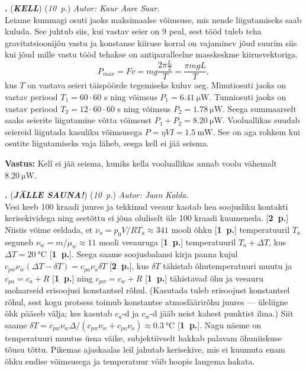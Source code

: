 \documentclass[12pt,a5paper]{article}
\newcommand{\numb}[1]{\vspace{5pt}\textbf{\large #1}}
\newcommand{\nimi}[1]{(\textsl{\small #1})}
\newcommand{\punktid}[1]{(\emph{#1~p.})}
\newcounter{ylesanne}
\newcommand{\yl}[1]{\addtocounter{ylesanne}{1}\numb{\theylesanne.} \nimi{\bf{#1}} \newblock{}}
\newcommand{\pp}[1]{[\textbf{#1~p.}]}
\newcommand{\autor}[1]{\emph{ Autor: #1.\\}}
\begin{document}
\yl{KELL} \punktid{10} \autor{Kaur Aare Saar}
Leiame kummagi osuti jaoks maksimaalse võimsuse, mis nende liigutamiseks saab
kuluda. See juhtub siis, kui vastav seier on $9$ peal, sest tööd tuleb teha
gravitatsioonijõu vastu ja konstanse kiiruse korral on vajaminev jõud suurim
siis kui jõud mille vastu tööd tehakse on antiparalleelne masskeskme
kiirusvektoriga.
$$P_{max} = F v = mg \frac{2 \pi \frac{L}{2}}{T} = \frac{\pi mgL}{T},$$
kus $T$ on vastava seieri täispöörde tegemiseks kuluv aeg.
Minutiosuti jaoks on vastav periood $T_1={60\cdot60}$ s ning võimsus $P_1 =\SI{6.41}{\micro\watt}$.
Tunniosuti jaoks on vastav periood $T_2={12\cdot 60\cdot60}$ s ning võimsus $P_2=\SI{1.78}{\micro\watt}$. Seega summaarselt saaks
seierite liigutamine võtta võimsust $P_1+P_2 = \SI {8.20}{\micro\watt}$.
Vooluallikas suudab seiereid liigutada kasuliku võimsusega
$P=\eta VI=\SI{1.5}{\milli\watt}$. See on aga rohkem kui osutite liigutamiseks
vaja läheb, seega kell ei jää seisma.

\textbf{Vastus:}
Kell ei jää seisma, kuniks kella vooluallikas annab voolu vähemalt
$\SI {8.20}{\micro\watt}$.


\yl{JÄLLE SAUNA!} \punktid{10} \autor{Jaan Kalda}
Vesi keeb 100 kraadi juures ja tekkinud veeaur kaotab hea soojusliku kontakti kerisekividega ning seetõttu ei jõua oluliselt üle 100 kraadi kuumeneda. \pp{2} Niisiis võime eeldada, et $\nu_a=p_0V/RT_a\approx 341$ mooli õhku \pp{1} temperatuuril $T_a$ seguneb $\nu_w=m/\mu_w\approx 11$ mooli veeauruga \pp{1} temperatuuril $T_a+\Delta T$, kus $\Delta T=\SI {20}\celsius$ \pp{1}. Seega saame soojusbalansi kirja panna kujul $c_{pw}\nu_w(\Delta T-\delta T)=c_{pa}\nu_a\delta T$ \pp{2}, kus $\delta T$ tähistab õhutemperatuuri muutu ja $c_{pa}=c_a+R$ \pp{1} ning $c_{pw}=c_w+R$ \pp{1} tähistavad õhu ja veeauru molaarseid erisoojusi konstantsel rõhul. (Kasutada tuleb erisoojust konstantsel rõhul, sest kogu protsess toimub konstantse atmosfäärirõhu juures --- üleliigne õhk pääseb välja; kes kasutab $c_a$-d ja $c_w$-d jääb neist kahest punktist ilma.) Siit saame $\delta T=c_{pw}\nu_w\Delta/(c_{pw}\nu_w+c_{pa}\nu_a)\approx\SI{0.3}\celsius$ \pp{1}. Nagu näeme on temperatuuri muutus üsna väike, subjektiivselt hakkab palavam õhuniiskuse tõusu tõttu. Pikemas ajaskaalas leil jahutab kerisekive, mis ei kuumuta enam õhku endise võimsusega ja temperatuur võib hoopis langema hakata.
\end{document}
